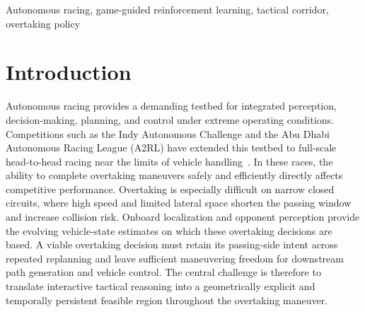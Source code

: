 \documentclass[journal,twoside,web]{ieeecolor}
\begin{document}
{{\begin{minipage}{\textwidth}
\begin{abstract}
\end{abstract}

\begin{IEEEkeywords}
Autonomous racing, game-guided reinforcement learning, tactical corridor,
overtaking policy
\end{IEEEkeywords}
\end{minipage}}}

\maketitle

\section{Introduction}
Autonomous racing provides a demanding testbed for integrated perception, decision-making, planning, and control under extreme operating conditions. Competitions such as the Indy Autonomous Challenge and the Abu Dhabi Autonomous Racing League (A2RL) have extended this testbed to full-scale head-to-head racing near the limits of vehicle handling~\cite{betz2022survey,hoffmann2026a2rl}. In these races, the ability to complete overtaking maneuvers safely and efficiently directly affects competitive performance. Overtaking is especially difficult on narrow closed circuits, where high speed and limited lateral space shorten the passing window and increase collision risk. Onboard localization and opponent perception provide the evolving vehicle-state estimates on which these overtaking decisions are based. A viable overtaking decision must retain its passing-side intent across repeated replanning and leave sufficient maneuvering freedom for downstream path generation and vehicle control. The central challenge is therefore to translate interactive tactical reasoning into a geometrically explicit and temporally persistent feasible region throughout the overtaking maneuver.


\end{document}

